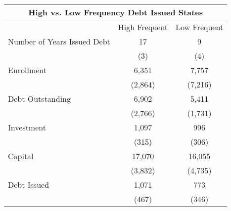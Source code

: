 
\begin{tabular}{lcc}
\hline
\multicolumn{3}{c}{High vs. Low Frequency Debt Issued States} \\
\hline
 & High Frequent & Low Frequent \\
\hline
Number of Years Issued Debt & 17 & 9 \\
                            & (3) & (4) \\
[1em]
Enrollment                  & 6,351 & 7,757 \\
                            & (2,864) & (7,216) \\
[1em]
Debt Outstanding            & 6,902 & 5,411 \\
                            & (2,766) & (1,731) \\
[1em]
Investment                  & 1,097 & 996 \\
                            & (315) & (306) \\
[1em]
Capital                     & 17,070 & 16,055 \\
                            & (3,832) & (4,735) \\
[1em]
Debt Issued                 & 1,071 & 773 \\
                            & (467) & (346) \\
\hline
\end{tabular}

